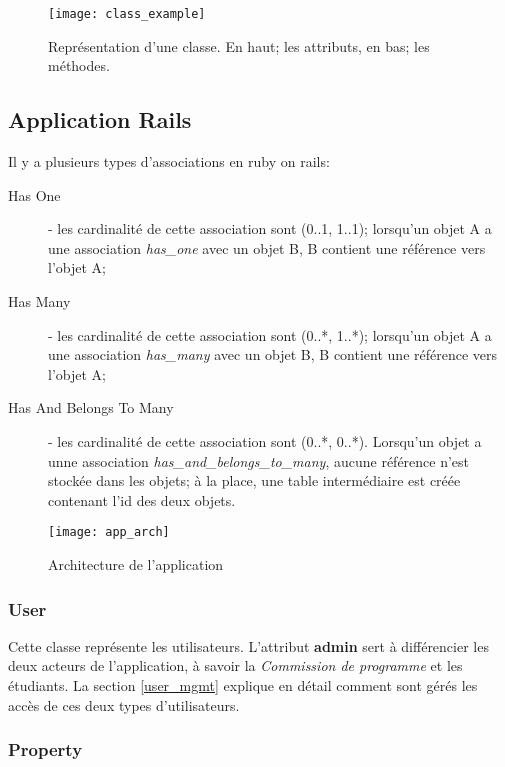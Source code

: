 \begin{figure}[H]
\centering
\caption{Représentation d'une classe. En haut; les attributs, en bas; les méthodes.}
\label{fig:class_example}
\texttt{[image: class\_example]}
\end{figure}


\clearpage
\subsection{Application Rails}
\label{rails_arch}

Il y a plusieurs types d'associations en ruby on rails:
\begin{description}
  \item[Has One] - les cardinalité de cette association sont (0..1, 1..1); lorsqu'un objet A a une association \textit{has\_one} avec un objet B, B contient une référence vers l'objet A; 
  \item[Has Many] - les cardinalité de cette association sont (0..*, 1..*); lorsqu'un objet A a une association \textit{has\_many} avec un objet B, B contient une référence vers l'objet A;
  \item[Has And Belongs To Many] - les cardinalité de cette association sont (0..*, 0..*). Lorsqu'un objet a unne association \textit{has\_and\_belongs\_to\_many}, aucune référence n'est stockée dans les objets; à la place, une table intermédiaire est créée contenant l'id des deux objets.  
\end{description}

\label{arch}
\begin{figure}
\centering
\caption{Architecture de l'application}
\label{fig:app_arch}
\texttt{[image: app\_arch]}
\end{figure}

\subsubsection{User} 

Cette classe représente les utilisateurs.  L'attribut \textbf{admin} sert à différencier les deux acteurs de l'application, à savoir la \textit{Commission de programme} et les étudiants. La section \ref{user_mgmt}
 explique en détail comment sont gérés les accès de ces deux types d'utilisateurs.

\subsubsection{Property}

